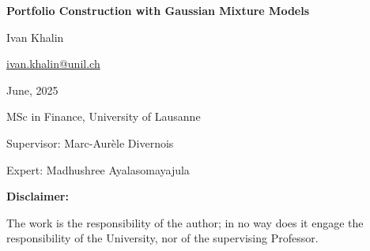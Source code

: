 

\begin{titlepage}
  \vspace*{4.5cm}
  \centering
  {\LARGE\bfseries Portfolio Construction with Gaussian Mixture Models\par}
  \vspace{1.5cm}

  {\Large Ivan Khalin\par}
  \vspace{0.2cm}
  {\small\href{mailto:ivan.khalin@unil.ch}{ivan.khalin@unil.ch}\par}
  \vspace{0.2cm}
  {\small June, 2025\par}
  \vspace{1cm}

  {\small MSc in Finance, University of Lausanne\par}
  {\small Supervisor: Marc-Aurèle Divernois\par}
  {\small Expert: Madhushree Ayalasomayajula\par}
  \vspace{2cm}

  \vfill
  {\footnotesize\textbf{Disclaimer:}\par
  The work is the responsibility of the author; in no way does it engage the responsibility of the University, nor of the supervising Professor.\par}

\end{titlepage}